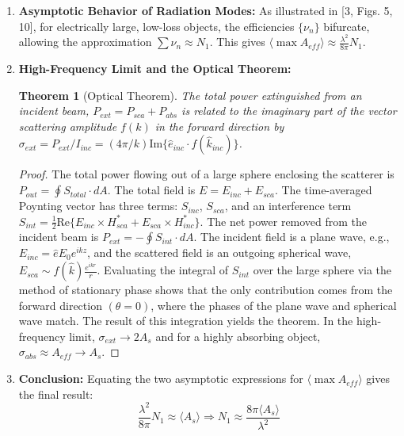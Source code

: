 \documentclass[11pt,a4paper]{article}
\newcommand{\avg}[1]{\langle #1 \rangle} %
\newtheorem{theorem}{Theorem}[section]
\begin{document}
\begin{enumerate}
    \item \textbf{Asymptotic Behavior of Radiation Modes:} As illustrated in [3, Figs. 5, 10], for electrically large, low-loss objects, the efficiencies \(\{\nu_{n}\}\) bifurcate, allowing the approximation \(\sum\nu_{n}\approx N_{1}\). This gives \(\avg{\max A_{eff}}\approx\frac{\lambda^{2}}{8\pi}N_{1}\).
    
    \item \textbf{High-Frequency Limit and the Optical Theorem:}
    
    \begin{theorem}[Optical Theorem]
    The total power extinguished from an incident beam, \(P_{ext}=P_{sca}+P_{abs}\) is related to the imaginary part of the vector scattering amplitude \(f(k)\) in the forward direction by \(\sigma_{ext}=P_{ext}/I_{inc}=(4\pi/k)\text{Im}\{\hat{e}_{inc} \cdot f(\hat{k}_{inc})\}\).
    \end{theorem}
    
    \begin{proof}
    The total power flowing out of a large sphere enclosing the scatterer is \(P_{out}=\oint S_{total}\cdot dA\). The total field is \(E=E_{inc}+E_{sca}\). The time-averaged Poynting vector has three terms: \(S_{inc}\), \(S_{sca}\), and an interference term \(S_{int}=\frac{1}{2}\text{Re}\{E_{inc}\times H_{sca}^{*}+E_{sca}\times H_{inc}^{*}\}\). The net power removed from the incident beam is \(P_{ext}=-\oint S_{int}\cdot dA\). The incident field is a plane wave, e.g., \(E_{inc}=\hat{e}E_{0}e^{ikz}\), and the scattered field is an outgoing spherical wave, \(E_{sca}\sim f(\hat{k})\frac{e^{ikr}}{r}\). Evaluating the integral of \(S_{int}\) over the large sphere via the method of stationary phase shows that the only contribution comes from the forward direction \((\theta=0)\), where the phases of the plane wave and spherical wave match. The result of this integration yields the theorem. In the high-frequency limit, \(\sigma_{ext}\rightarrow2A_{s}\) and for a highly absorbing object, \(\sigma_{abs}\approx A_{eff}\rightarrow A_{s}\).
    \end{proof}
    
    \item \textbf{Conclusion:} Equating the two asymptotic expressions for \(\avg{\max A_{eff}}\) gives the final result:
    \begin{equation}
        \frac{\lambda^{2}}{8\pi}N_{1}\approx\avg{A_{s}} \Rightarrow N_{1}\approx\frac{8\pi\avg{A_{s}}}{\lambda^{2}}
    \end{equation}
\end{enumerate}
\end{document}
